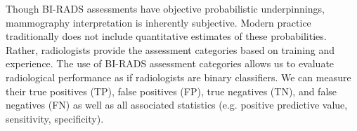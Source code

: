 Though BI-RADS assessments have objective probabilistic underpinnings, mammography interpretation is inherently subjective. Modern practice traditionally does not include quantitative estimates of these probabilities. Rather, radiologists provide the assessment categories based on training and experience. The use of BI-RADS assessment categories allows us to evaluate radiological performance as if radiologists are binary classifiers. We can measure their true positives (TP), false positives (FP), true negatives (TN), and false negatives (FN) as well as all associated statistics (e.g. positive predictive value, sensitivity, specificity).
